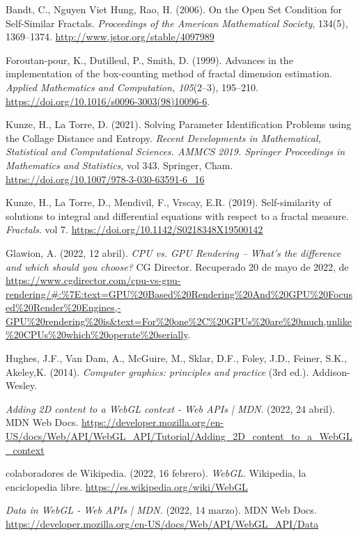 \begin{thebibliography}{99}
 Bandt, C., Nguyen Viet Hung, Rao, H. (2006). On the Open Set Condition for Self-Similar Fractals. \textit{Proceedings of the American Mathematical Society}, 134(5), 1369–1374. \url{http://www.jstor.org/stable/4097989}


 Foroutan-pour, K., Dutilleul, P., Smith, D. (1999). Advances in the implementation of the box-counting method of fractal dimension estimation. \textit{Applied Mathematics and Computation, 105}(2–3), 195–210. \url{https://doi.org/10.1016/s0096-3003(98)10096-6}.

 Kunze, H., La Torre, D. (2021). Solving Parameter Identification Problems using the Collage Distance and Entropy. \textit{Recent Developments in Mathematical, Statistical and Computational Sciences. AMMCS 2019. Springer Proceedings in Mathematics and Statistics}, vol 343. Springer, Cham. \url{https://doi.org/10.1007/978-3-030-63591-6_16}

 Kunze, H., La Torre, D., Mendivil, F., Vrscay, E.R. (2019). Self-similarity of solutions to integral and differential equations with respect to a fractal measure. \textit{Fractals}. vol 7. \url{https://doi.org/10.1142/S0218348X19500142}

 Glawion, A. (2022, 12 abril). \textit{CPU vs. GPU Rendering – What’s the difference and which should you choose?} CG Director. Recuperado 20 de mayo de 2022, de \url{https://www.cgdirector.com/cpu-vs-gpu-rendering/#:%7E:text=GPU%20Based%20Rendering%20And%20GPU%20Focused%20Render%20Engines,-GPU%20rendering%20is&text=For%20one%2C%20GPUs%20are%20much,unlike%20CPUs%20which%20operate%20serially}.

 Hughes, J.F., Van Dam, A., McGuire, M., Sklar, D.F., Foley, J.D., Feiner, S.K., Akeley,K. (2014). \textit{Computer graphics: principles and practice} (3rd ed.). Addison-Wesley.


 \textit{Adding 2D content to a WebGL context - Web APIs | MDN}. (2022, 24 abril). MDN Web Docs. \url{https://developer.mozilla.org/en-US/docs/Web/API/WebGL_API/Tutorial/Adding_2D_content_to_a_WebGL_context}

 colaboradores de Wikipedia. (2022, 16 febrero). \textit{WebGL}. Wikipedia, la enciclopedia libre. \url{https://es.wikipedia.org/wiki/WebGL}



 \textit{Data in WebGL - Web APIs | MDN.} (2022, 14 marzo). MDN Web Docs. \url{https://developer.mozilla.org/en-US/docs/Web/API/WebGL_API/Data}


\end{thebibliography}
